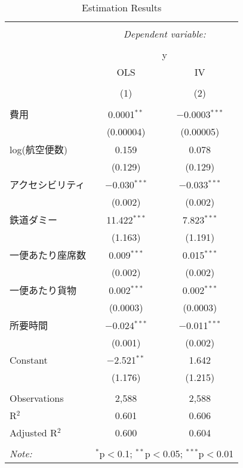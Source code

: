 
\begin{table}[!htbp] \centering 
  \caption{Estimation Results} 
  \label{} 
\begin{tabular}{@{\extracolsep{5pt}}lcc} 
\\[-1.8ex]\hline 
\hline \\[-1.8ex] 
 & \multicolumn{2}{c}{\textit{Dependent variable:}} \\ 
\cline{2-3} 
\\[-1.8ex] & \multicolumn{2}{c}{y} \\ 
 & OLS & IV \\ 
\\[-1.8ex] & (1) & (2)\\ 
\hline \\[-1.8ex] 
 費用 & 0.0001$^{**}$ & $-$0.0003$^{***}$ \\ 
  & (0.00004) & (0.00005) \\ 
  log(航空便数) & 0.159 & 0.078 \\ 
  & (0.129) & (0.129) \\ 
  アクセシビリティ & $-$0.030$^{***}$ & $-$0.033$^{***}$ \\ 
  & (0.002) & (0.002) \\ 
  鉄道ダミー & 11.422$^{***}$ & 7.823$^{***}$ \\ 
  & (1.163) & (1.191) \\ 
  一便あたり座席数 & 0.009$^{***}$ & 0.015$^{***}$ \\ 
  & (0.002) & (0.002) \\ 
  一便あたり貨物 & 0.002$^{***}$ & 0.002$^{***}$ \\ 
  & (0.0003) & (0.0003) \\ 
  所要時間 & $-$0.024$^{***}$ & $-$0.011$^{***}$ \\ 
  & (0.001) & (0.002) \\ 
  Constant & $-$2.521$^{**}$ & 1.642 \\ 
  & (1.176) & (1.215) \\ 
 \hline \\[-1.8ex] 
Observations & 2,588 & 2,588 \\ 
R$^{2}$ & 0.601 & 0.606 \\ 
Adjusted R$^{2}$ & 0.600 & 0.604 \\ 
\hline 
\hline \\[-1.8ex] 
\textit{Note:}  & \multicolumn{2}{r}{$^{*}$p$<$0.1; $^{**}$p$<$0.05; $^{***}$p$<$0.01} \\ 
\end{tabular} 
\end{table} 
